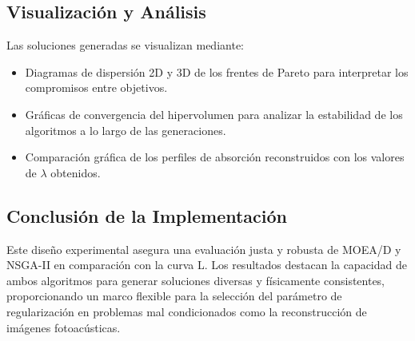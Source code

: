 \subsection{Visualización y Análisis}
Las soluciones generadas se visualizan mediante:
\begin{itemize}
    \item Diagramas de dispersión 2D y 3D de los frentes de Pareto para interpretar los compromisos entre objetivos.
    \item Gráficas de convergencia del hipervolumen para analizar la estabilidad de los algoritmos a lo largo de las generaciones.
    \item Comparación gráfica de los perfiles de absorción reconstruidos con los valores de \( \lambda \) obtenidos.
\end{itemize}

\subsection{Conclusión de la Implementación}
Este diseño experimental asegura una evaluación justa y robusta de MOEA/D y NSGA-II en comparación con la curva L. Los resultados destacan la capacidad de ambos algoritmos para generar soluciones diversas y físicamente consistentes, proporcionando un marco flexible para la selección del parámetro de regularización en problemas mal condicionados como la reconstrucción de imágenes fotoacústicas.
